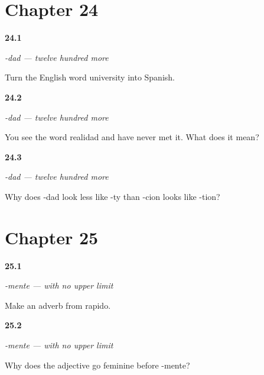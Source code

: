 \section*{Chapter 24}

\noindent\begin{minipage}[t]{\linewidth}
\raggedright
\hypertarget{review-ES-C56-dad-make}{\textbf{24.1}} \emph{-dad — twelve hundred more}\par
\small Turn the English word university into Spanish.
\end{minipage}\par\medskip

\noindent\begin{minipage}[t]{\linewidth}
\raggedright
\hypertarget{review-ES-C56-dad-read}{\textbf{24.2}} \emph{-dad — twelve hundred more}\par
\small You see the word realidad and have never met it. What does it mean?
\end{minipage}\par\medskip

\noindent\begin{minipage}[t]{\linewidth}
\raggedright
\hypertarget{review-ES-C56-dad-why}{\textbf{24.3}} \emph{-dad — twelve hundred more}\par
\small Why does -dad look less like -ty than -cion looks like -tion?
\end{minipage}\par\medskip

\section*{Chapter 25}

\noindent\begin{minipage}[t]{\linewidth}
\raggedright
\hypertarget{review-ES-C56-mente-make}{\textbf{25.1}} \emph{-mente — with no upper limit}\par
\small Make an adverb from rapido.
\end{minipage}\par\medskip

\noindent\begin{minipage}[t]{\linewidth}
\raggedright
\hypertarget{review-ES-C56-mente-fem}{\textbf{25.2}} \emph{-mente — with no upper limit}\par
\small Why does the adjective go feminine before -mente?
\end{minipage}\par\medskip


